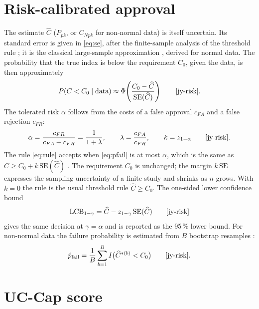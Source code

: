 \documentclass[a4paper,11pt,oneside,openany,parskip=half-,headings=standardclasses,toc=flat,numbers=noenddot]{scrbook}
\begin{document}
\section{Risk-calibrated approval}\label{app:f-risk}

The estimate $\widehat C$ ($P_{pk}$, or $C_{Npk}$ for non-normal data) is itself uncertain. Its standard error is
given in \eqref{eq:se}, after the finite-sample analysis of the threshold rule \cite{jy-instability} \cite[App.~A]{jy-risk};
it is the classical large-sample approximation \cite{bissell}, derived for normal data. The probability that the
true index is below the requirement $C_0$, given the data, is then approximately
\begin{equation}\label{eq:pfail}
P(C < C_0 \mid \text{data}) \approx \Phi\!\left(\frac{C_0 - \widehat C}{\mathrm{SE}(\widehat C)}\right) \qquad \text{\cite[Eq.~(26)]{jy-risk}}.
\end{equation}
The tolerated risk $\alpha$ follows from the costs of a false approval $c_{FA}$ and a false rejection $c_{FR}$:
\begin{equation}\label{eq:alpha}
\alpha = \frac{c_{FR}}{c_{FA}+c_{FR}} = \frac{1}{1+\lambda}, \qquad \lambda = \frac{c_{FA}}{c_{FR}}, \qquad
k = z_{1-\alpha} \qquad \text{\cite[Eqs.~(19), (45)]{jy-risk}}.
\end{equation}
The rule \eqref{eq:rule} accepts when \eqref{eq:pfail} is at most $\alpha$, which is the same as
$\widehat C \ge C_0 + k\,\mathrm{SE}(\widehat C)$ \cite[Eqs.~(28), (29)]{jy-risk}. The requirement $C_0$ is unchanged; the margin
$k\,\mathrm{SE}$ expresses the sampling uncertainty of a finite study and shrinks as $n$ grows. With $k = 0$ the rule is
the usual threshold rule $\widehat C \ge C_0$. The one-sided lower confidence bound
\begin{equation}\label{eq:lcb}
\mathrm{LCB}_{1-\gamma} = \widehat C - z_{1-\gamma}\,\mathrm{SE}(\widehat C) \qquad \text{\cite[Eq.~(34)]{jy-risk}}
\end{equation}
gives the same decision at $\gamma = \alpha$ and is reported as the 95\,\% lower bound. For non-normal data the
failure probability is estimated from $B$ bootstrap resamples \cite{efron}:
\begin{equation}\label{eq:boot}
\hat p_{\text{fail}} = \frac{1}{B}\sum_{b=1}^{B} I\bigl(\widehat C^{*(b)} < C_0\bigr) \qquad \text{\cite[Eq.~(B.1)]{jy-risk}}.
\end{equation}

\section{UC-Cap score}\label{app:f-uccap}
\end{document}
